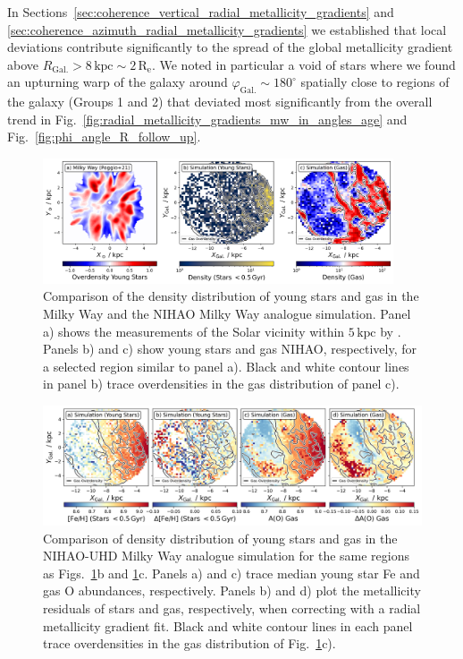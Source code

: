 \documentclass[twocolumn,apj,numberedappendix,appendixfloats,twocolappendix]{openjournal}
\begin{document}
\begin{CJK*}{UTF8}{gbsn}
In Sections~\ref{sec:coherence_vertical_radial_metallicity_gradients} and \ref{sec:coherence_azimuth_radial_metallicity_gradients} we established that local deviations contribute significantly to the spread of the global metallicity gradient above $R_\mathrm{Gal.} > 8\,\mathrm{kpc} \sim 2\,\mathrm{R_e}$. We noted in particular a void of stars where we found an upturning warp of the galaxy around $\varphi_\mathrm{Gal.} \sim 180^\circ$ spatially close to regions of the galaxy (Groups 1 and 2) that deviated most significantly from the overall trend in Fig.~\ref{fig:radial_metallicity_gradients_mw_in_angles_age} and Fig.~\ref{fig:phi_angle_R_follow_up}.


\begin{figure}
    \centering
    \includegraphics[width=0.925\textwidth]{figures/overdensities_mw_vs_nihao.png}
    \caption{Comparison of the density distribution of young stars and gas in the Milky Way and the NIHAO Milky Way analogue simulation. Panel a) shows the measurements of the Solar vicinity within $5\,\mathrm{kpc}$ by \citet{Poggio2021}. Panels b) and c) show young stars and gas NIHAO, respectively, for a selected region similar to panel a). Black and white contour lines in panel b) trace overdensities in the gas distribution of panel c).}
    \label{fig:overdensities_mw_vs_nihao}
\end{figure}

\begin{figure}
    \centering
    \includegraphics[width=\textwidth]{figures/nihao_gas_stars_density_overlay_ao.png}
    \caption{Comparison of density distribution of young stars and gas in the NIHAO-UHD Milky Way analogue simulation for the same regions as Figs.~\ref{fig:overdensities_mw_vs_nihao}b and \ref{fig:overdensities_mw_vs_nihao}c. Panels a) and c) trace median young star Fe and gas O abundances, respectively. Panels b) and d) plot the metallicity residuals of stars and gas, respectively, when correcting with a radial metallicity gradient fit. Black and white contour lines in each panel trace overdensities in the gas distribution of Fig.~\ref{fig:overdensities_mw_vs_nihao}c).}
    \label{fig:nihao_gas_stars_density_overlay_ao}
\end{figure}


\end{CJK*}
\end{document}
